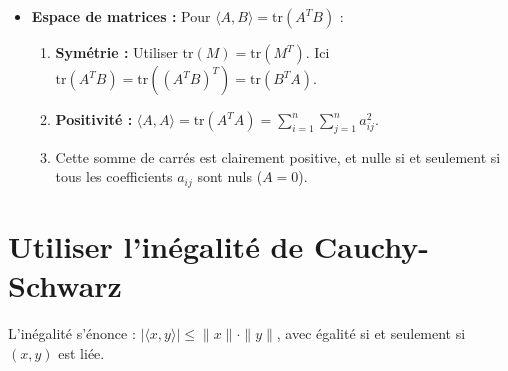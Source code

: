 \documentclass[french]{yLectureNote}
\begin{document}
\begin{itemize}
{\begin{itemize}
    \item \textbf{Substitution :} On remplace tous les $y_i$ par des $x_i$ dans l'expression de $\varphi$.
    \item \textbf{Réduction :} On regroupe les termes pour obtenir une somme de carrés (Méthode de Gauss).
    \item \textbf{Exemple (Ex 1.c) :} 
    $\varphi(x, y) = x_1y_1 - x_2y_1 - x_1y_2 + \lambda x_2y_2$ \\
    $\implies q(x) = x_1^2 - 2x_1x_2 + \lambda x_2^2 = (x_1 - x_2)^2 + (\lambda - 1)x_2^2$.
\end{itemize}

}
    \item \textbf{Espace de matrices :} Pour $\langle A, B \rangle = \text{tr}(A^T B)$ :
    \begin{enumerate}
        \item \textbf{Symétrie :} Utiliser $\text{tr}(M) = \text{tr}(M^T)$. Ici $\text{tr}(A^T B) = \text{tr}((A^T B)^T) = \text{tr}(B^T A)$.
        \item \textbf{Positivité :} $\langle A, A \rangle = \text{tr}(A^T A) = \sum_{i=1}^n \sum_{j=1}^n a_{ij}^2$.
        \item Cette somme de carrés est clairement positive, et nulle si et seulement si tous les coefficients $a_{ij}$ sont nuls ($A=0$).
    \end{enumerate}
\end{itemize}
\section{Utiliser l'inégalité de Cauchy-Schwarz}
L'inégalité s'énonce : $|\langle x, y \rangle| \leq \|x\| \cdot \|y\|$, avec égalité si et seulement si $(x, y)$ est liée.
\end{document}
